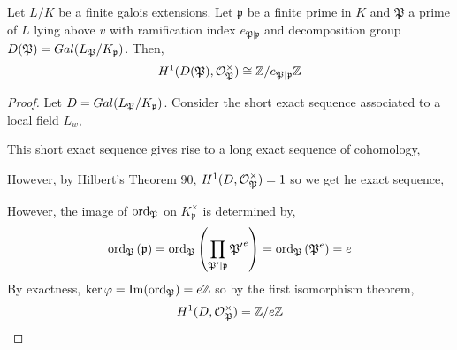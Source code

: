 \documentclass[12pt]{extarticle}
\begin{document}
\begin{lemma} \label{ramification}
Let $L/K$ be a finite galois extensions. Let $\mathfrak{p}$ be a finite prime in $K$ and $\mathfrak{P}$ a prime of $L$ lying above $v$ with ramification index $e_{\mathfrak{P} | \mathfrak{p}}$ and decomposition group $D(\mathfrak{P}) = Gal \small(L_{\mathfrak{P}}/K_{\mathfrak{p}} \small)$. Then, 
\[H^1(D(\mathfrak{P}), \mathcal{O}_{\mathfrak{P}}^\times) \cong \mathbb{Z} / e_{\mathfrak{P} | \mathfrak{p}} \mathbb{Z}\]
\end{lemma}

\begin{proof}
Let $D = Gal \small(L_{\mathfrak{P}}/K_{\mathfrak{p}} \small)$. Consider the short exact sequence associated to a local field $L_w$,
\begin{center}
\end{center}
This short exact sequence gives rise to a long exact sequence of cohomology,
\begin{center}
\end{center}
However, by Hilbert's Theorem 90, $H^1(D, \mathcal{O}_{\mathfrak{P}}^\times) = 1$ so we get he exact sequence,
\begin{center}
\end{center}
However, the image of $\mathrm{ord}_{\mathfrak{P}}$ on $K^\times_{\mathfrak{p}}$ is determined by, 
\[\mathrm{ord}_{\mathfrak{P}} \left( \mathfrak{p} \right) = \mathrm{ord}_{\mathfrak{P}} \left( \prod_{\mathfrak{P'} \mid \mathfrak{p}} \mathfrak{P'}^e \right) = \mathrm{ord}_{\mathfrak{P}} \left( \mathfrak{P}^e \right) = e\]
By exactness, $\ker{\varphi} = \mathrm{Im}(\mathrm{ord}_{\mathfrak{P}}) = e \mathbb{Z}$ so by the first isomorphism theorem,
\[ H^1(D, \mathcal{O}_{\mathfrak{P}}^\times) = \mathbb{Z} / e \mathbb{Z} \]
\end{proof}
\end{document}
